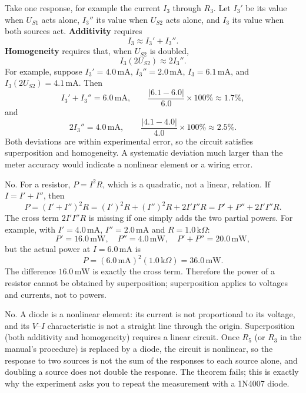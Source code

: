 \documentclass[11pt]{ctexart}
\begin{document}
Take one response, for example the current \(I_3\) through \(R_3\). Let \(I_3'\) be its value when \(U_{S1}\) acts alone, \(I_3''\) its value when \(U_{S2}\) acts alone, and \(I_3\) its value when both sources act. \textbf{Additivity} requires
\[
I_3 \approx I_3'+I_3'' .
\]
\textbf{Homogeneity} requires that, when \(U_{S2}\) is doubled,
\[
I_3(2U_{S2}) \approx 2I_3'' .
\]
For example, suppose \(I_3'=4.0\,\mathrm{mA}\), \(I_3''=2.0\,\mathrm{mA}\), \(I_3=6.1\,\mathrm{mA}\), and \(I_3(2U_{S2})=4.1\,\mathrm{mA}\). Then
\[
I_3'+I_3''=6.0\,\mathrm{mA},\qquad
\frac{|6.1-6.0|}{6.0}\times100\%\approx1.7\% ,
\]
and
\[
2I_3''=4.0\,\mathrm{mA},\qquad
\frac{|4.1-4.0|}{4.0}\times100\%\approx2.5\% .
\]
Both deviations are within experimental error, so the circuit satisfies superposition and homogeneity. A systematic deviation much larger than the meter accuracy would indicate a nonlinear element or a wiring error.

No. For a resistor, \(P=I^2R\), which is a quadratic, not a linear, relation. If \(I=I'+I''\), then
\[
P=(I'+I'')^2R=(I')^2R+(I'')^2R+2I'I''R
=P'+P''+2I'I''R .
\]
The cross term \(2I'I''R\) is missing if one simply adds the two partial powers. For example, with \(I'=4.0\,\mathrm{mA}\), \(I''=2.0\,\mathrm{mA}\) and \(R=1.0\,\mathrm{k}\Omega\):
\[
P'=16.0\,\mathrm{mW},\quad P''=4.0\,\mathrm{mW},\quad
P'+P''=20.0\,\mathrm{mW},
\]
but the actual power at \(I=6.0\,\mathrm{mA}\) is
\[
P=(6.0\,\mathrm{mA})^2(1.0\,\mathrm{k}\Omega)=36.0\,\mathrm{mW}.
\]
The difference \(16.0\,\mathrm{mW}\) is exactly the cross term. Therefore the power of a resistor cannot be obtained by superposition; superposition applies to voltages and currents, not to powers.

No. A diode is a nonlinear element: its current is not proportional to its voltage, and its \(V\)--\(I\) characteristic is not a straight line through the origin. Superposition (both additivity and homogeneity) requires a linear circuit. Once \(R_5\) (or \(R_3\) in the manual's procedure) is replaced by a diode, the circuit is nonlinear, so the response to two sources is not the sum of the responses to each source alone, and doubling a source does not double the response. The theorem fails; this is exactly why the experiment asks you to repeat the measurement with a 1N4007 diode.

\end{document}
